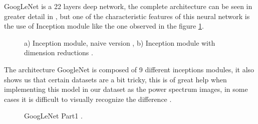 \documentclass[letterpaper,12pt,openright,oneside]{article}
\begin{document}
GoogLeNet is a 22 layers deep network, the complete architecture can be seen in greater detail in \cite{szegedy2014going} , but one of the characteristic features of this neural network is the use of Inception module like the one observed in the figure \ref{fig 110}.\\

\begin{figure}[H]
\centerline{}
\caption{a) Inception module, naive version , b) Inception module with dimension reductions .}
\label{fig 110}
\end{figure}


The architecture GoogleNet is composed of 9 different inceptions modules, it also shows us that certain datasets are a bit tricky, this is of great help when implementing this model in our dataset as the power spectrum images, in some cases it is difficult to visually recognize the difference \cite{szegedy2014going}.\\





\begin{figure}[H]
\centerline{}
\caption{GoogLeNet Part1 .}
\label{fig 111}
\end{figure}





\end{document}
